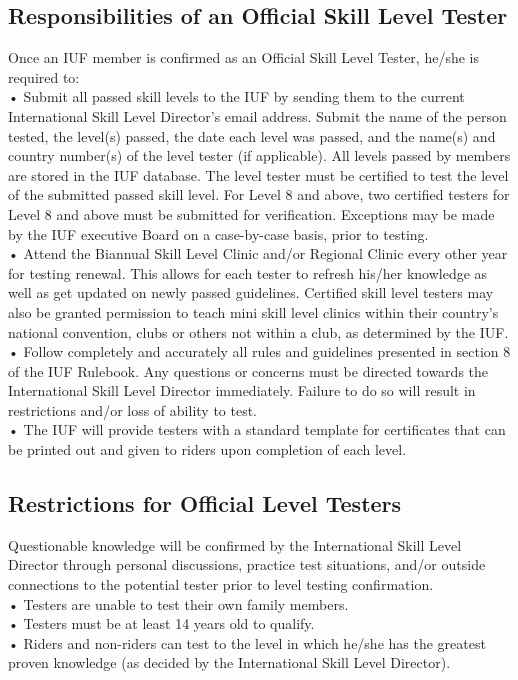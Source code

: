 \subsection{Responsibilities of an Official Skill Level Tester}
Once an IUF member is confirmed as an Official Skill Level Tester, he/she is required to:\\
• Submit all passed skill levels to the IUF by sending them to the current International Skill Level Director's email
address. Submit the name of the person tested, the level(s) passed, the date each level was passed, and the
name(s) and country number(s) of the level tester (if applicable). All levels passed by members are stored in the
IUF database. The level tester must be certified to test the level of the submitted passed skill level. For Level 8
and above, two certified testers for Level 8 and above must be submitted for verification. Exceptions may be
made by the IUF executive Board on a case-by-case basis, prior to testing.\\
• Attend the Biannual Skill Level Clinic and/or Regional Clinic every other year for testing renewal. This allows for
each tester to refresh his/her knowledge as well as get updated on newly passed guidelines. Certified skill level
testers may also be granted permission to teach mini skill level clinics within their country's national convention,
clubs or others not within a club, as determined by the IUF.\\
• Follow completely and accurately all rules and guidelines presented in section 8 of the IUF Rulebook. Any
questions or concerns must be directed towards the International Skill Level Director immediately. Failure to do
so will result in restrictions and/or loss of ability to test.\\
• The IUF will provide testers with a standard template for certificates that can be printed out and given to riders
upon completion of each level.\\
\subsection{ Restrictions for Official Level Testers}
Questionable knowledge will be confirmed by the International Skill Level Director through personal discussions,
practice test situations, and/or outside connections to the potential tester prior to level testing confirmation.\\
• Testers are unable to test their own family members.\\
• Testers must be at least 14 years old to qualify.\\
• Riders and non-riders can test to the level in which he/she has the greatest proven knowledge (as decided by the
International Skill Level Director).
